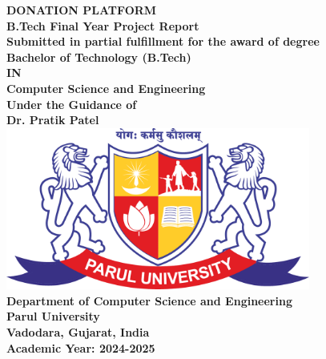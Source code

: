 \begin{titlepage}
    \centering
    \vspace{1cm}
    
    {\huge \textbf{DONATION PLATFORM}} \\[1.5cm]  
    
    {\Large \textbf{B.Tech Final Year Project Report}} \\[1cm]
    
    \textbf{Submitted in partial fulfillment for the award of degree}\\[0.5cm]
    {\Large \textbf{Bachelor of Technology (B.Tech)}} \\[0.5cm]
    
    \textbf{IN}\\[0.3cm]
    {\Large \textbf{Computer Science and Engineering}}\\[1cm]
    

    \textbf{Under the Guidance of}\\[0.3cm]
    {\Large \textbf{Dr. Pratik Patel}}\\[0.5cm]

    \vspace{2cm}
    \includegraphics[width=10cm]{images/parullogo.png} \\[0.5cm] 
    
    {\Large \textbf{Department of Computer Science and Engineering}}\\[0.8cm]
    {\Large \textbf{Parul University}}\\[0.3cm]
    {\Large \textbf{Vadodara, Gujarat, India}}\\[0.5cm]

    {\Large \textbf{Academic Year: 2024-2025}} 
    
    \vspace{1cm} %
\end{titlepage}
\clearpage  %

